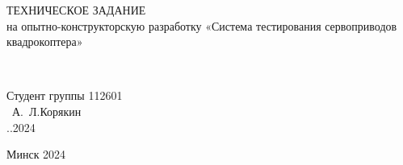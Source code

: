 \begin{titlepage}
\vfill
\begin{center}
  ТЕХНИЧЕСКОЕ ЗАДАНИЕ\\
  на опытно-конструкторскую разработку
  «Система тестирования сервоприводов квадрокоптера»
\end{center}

\vfill
\begin{flushright}
  \begin{minipage}{6cm}
    \\
    \raggedright
    Студент  группы 112601\\
    \underline{\hspace*{2cm}} ~А.~Л.Корякин\\
    \underline{\hspace*{0.5cm}}.\underline{\hspace*{0.5cm}}.2024\\
  \end{minipage}
\end{flushright}


\vfill
\begin{center}
    {\normalsize Минск 2024}
\end{center}

\end{titlepage}
